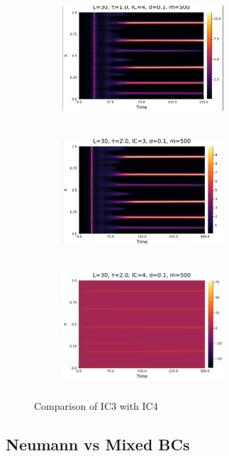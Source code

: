 \documentclass[12pt,a4paper]{article}
\begin{document}
\begin{figure}[H]
\begin{subfigure}[b]{0.45\linewidth}
        \centering
        \includegraphics[width=6cm,height = 4.5cm]{l30t1ic4s1e1.png}
        \caption{}
        \label{}
    \end{subfigure}
    \hfill
    \begin{subfigure}[b]{0.45\linewidth}
        \centering
        \includegraphics[width=6cm,height = 4.5cm]{l30t2ic3s1e1.png}
        \caption{}
        \label{}
    \end{subfigure}
    \hfill
    \begin{subfigure}[b]{0.45\linewidth}
        \centering
        \includegraphics[width=6cm,height = 4.5cm]{l30t2ic4s1e1.png}
        \caption{}
        \label{}
    \end{subfigure}
    \caption{Comparison of IC3 with IC4}
    \label{}
\end{figure}


\newpage
\subsection{Neumann vs Mixed BCs}
\end{document}
